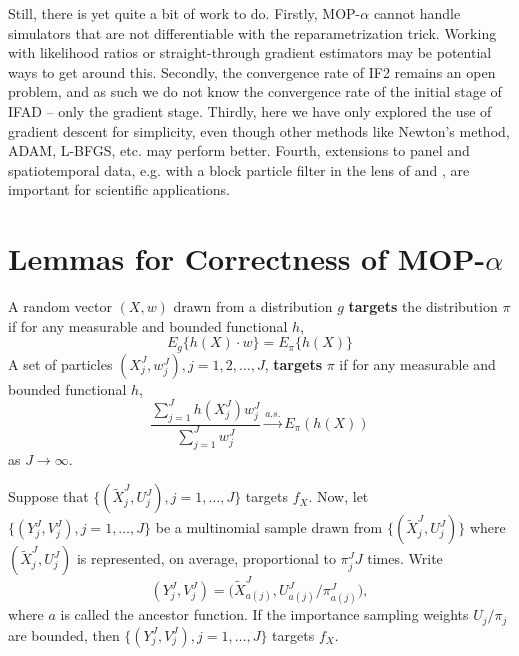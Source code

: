 \documentclass{article}
\begin{document}
Still, there is yet quite a bit of work to do. Firstly, MOP-$\alpha$ cannot handle simulators that are not differentiable with the reparametrization trick. Working with likelihood ratios or straight-through gradient estimators may be potential ways to get around this. Secondly, the convergence rate of IF2 remains an open problem, and as such we do not know the convergence rate of the initial stage of IFAD -- only the gradient stage. Thirdly, here we have only explored the use of gradient descent for simplicity, even though other methods like Newton's method, ADAM, L-BFGS, etc. may perform better. Fourth, extensions to panel and spatiotemporal data, e.g. with a block particle filter in the lens of \cite{ionides22} and \cite{ning23}, are important for scientific applications. 





\appendix
\section{Lemmas for Correctness of MOP-$\alpha$}
\label{app:lemmas}
\begin{defn}[Targeting]
    A random vector $(X, w)$ drawn from a distribution $g$ \textbf{targets} the distribution $\pi$ if for any measurable and bounded functional $h$,
\begin{equation}
    E_g\{h(X) \cdot w\}=E_\pi\{h(X)\}
\end{equation}  
    A set of particles $(X^J_j, w^J_j), j=1,2, \ldots,J$, \textbf{targets} $\pi$ if for any measurable and bounded functional $h$,
\begin{equation}
    \frac{\sum_{j=1}^J h(X^J_j) w^J_j}{\sum_{j=1}^J w^J_j} \stackrel{a.s.}{\to} E_\pi(h(X))
\end{equation}
as $J \to \infty$.
\end{defn}


\begin{lem}
    \label{lem:change-measure-proper-weights}
    Suppose that $\{(\tilde X_j^J,U_j^J),j=1,\dots,J\}$ targets $f_X$. Now, let $\{(Y_j^J,V_j^J),j=1,\dots,J\}$ be a multinomial sample drawn from $\{(\tilde X_j^J,U_j^J)\}$ where $(\tilde X_j^J,U_j^J)$ is represented, on average, proportional to $\pi^J_j J$ times. Write
    \[
    (Y_j^J,V_j^J) = \big(\tilde X^J_{a(j)},U^J_{a(j)}/\pi^J_{a(j)}\big),
    \]
    where $a$ is called the ancestor function. If the importance sampling weights $U_j/\pi_j$ are bounded, then $\{(Y^J_j,V^J_j),j=1,\dots,J\}$ targets $f_X$.
\end{lem}
\end{document}
